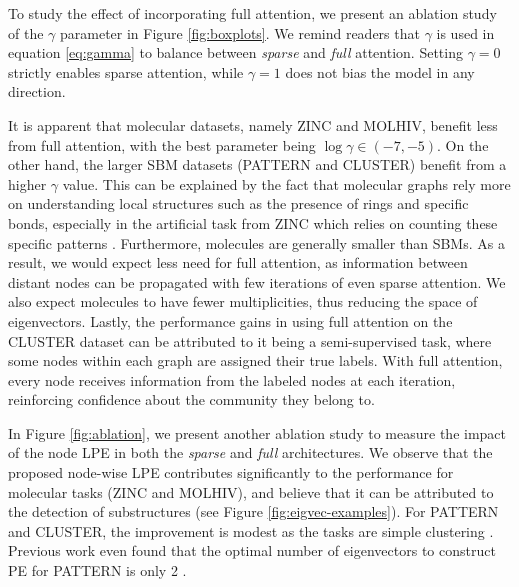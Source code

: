 \documentclass{article}
\begin{document}
To study the effect of incorporating full attention, we present an ablation study of the $\gamma$ parameter in Figure \ref{fig:boxplots}. We remind readers that $\gamma$ is used in equation \ref{eq:gamma} to balance between \textit{sparse} and \textit{full} attention. Setting $\gamma=0$ strictly enables sparse attention, while $\gamma=1$ does not bias the model in any direction.

It is apparent that molecular datasets, namely ZINC and MOLHIV, benefit less from full attention, with the best parameter being $\log\gamma \in (-7, -5)$. On the other hand, the larger SBM datasets (PATTERN and CLUSTER) benefit from a higher $\gamma$ value. This can be explained by the fact that molecular graphs rely more on understanding local structures such as the presence of rings and specific bonds, especially in the artificial task from ZINC which relies on counting these specific patterns \cite{dwivedi2020benchmarking}. Furthermore, molecules are generally smaller than SBMs. As a result, we would expect less need for full attention, as information between distant nodes can be propagated with few iterations of even sparse attention. We also expect molecules to have fewer multiplicities, thus reducing the space of eigenvectors. Lastly, the performance gains in using full attention on the CLUSTER dataset can be attributed to it being a semi-supervised task, where some nodes within each graph are assigned their true labels. With full attention, every node receives information from the labeled nodes at each iteration, reinforcing confidence about the community they belong to. 

In Figure \ref{fig:ablation}, we present another ablation study to measure the impact of the node LPE in both the \textit{sparse} and \textit{full} architectures. We observe that the proposed node-wise LPE contributes significantly to the performance for molecular tasks (ZINC and MOLHIV), and believe that it can be attributed to the detection of substructures (see Figure \ref{fig:eigvec-examples}). For PATTERN and CLUSTER, the improvement is modest as the tasks are simple clustering \cite{dwivedi2020benchmarking}. 
Previous work even found that the optimal number of eigenvectors to construct PE for PATTERN is only 2 \cite{dwivedi2020generalization}.

\end{document}
